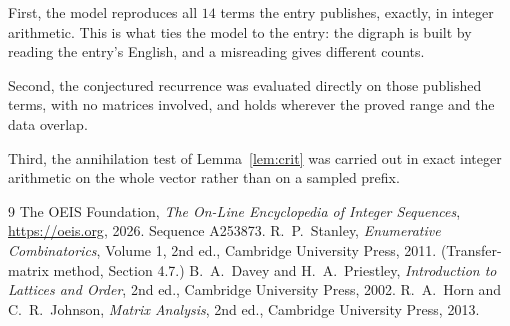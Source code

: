 \documentclass[11pt,a4paper]{article}
\theoremstyle{plain}
\theoremstyle{definition}
\begin{document}
First, the model reproduces all $14$ terms the entry publishes, exactly, in integer
arithmetic. This is what ties the model to the entry: the digraph is built by reading the
entry's English, and a misreading gives different counts.

Second, the conjectured recurrence was evaluated directly on those published terms, with no
matrices involved, and holds wherever the proved range and the data overlap.

Third, the annihilation test of Lemma~\ref{lem:crit} was carried out in exact integer
arithmetic on the whole vector rather than on a sampled prefix.

\begin{thebibliography}{9}
 The OEIS Foundation, \emph{The On-Line Encyclopedia of Integer
Sequences}, \url{https://oeis.org}, 2026. Sequence A253873.
 R.~P.~Stanley, \emph{Enumerative Combinatorics}, Volume 1, 2nd ed.,
Cambridge University Press, 2011. (Transfer-matrix method, Section 4.7.)
 B.~A.~Davey and H.~A.~Priestley, \emph{Introduction to Lattices and
Order}, 2nd ed., Cambridge University Press, 2002.
 R.~A.~Horn and C.~R.~Johnson, \emph{Matrix Analysis}, 2nd ed., Cambridge
University Press, 2013.
\end{thebibliography}
\end{document}
